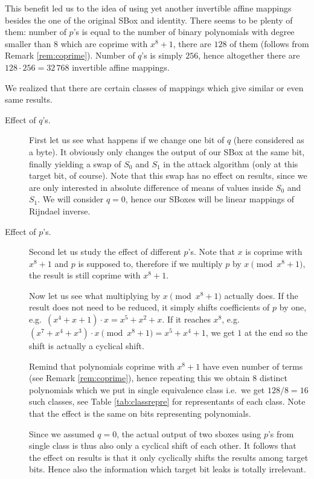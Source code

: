This benefit led us to the idea of using yet another invertible affine mappings besides the one of the original SBox and identity. There seems to be plenty of them: number of $p$'s is equal to the number of binary polynomials with degree smaller than $8$ which are coprime with $x^8+1$, there are $128$ of them (follows from Remark \ref{rem:coprime}). Number of $q$'s is simply $256$, hence altogether there are $128\cdot 256 = 32\,768$ invertible affine mappings.

\begin{remark}
\label{rem:pqeffect}
	We realized that there are certain classes of mappings which give similar or even same results.
	\begin{description}
		\item[Effect of $q$'s.]
			First let us see what happens if we change one bit of $q$ (here considered as a byte). It obviously only changes the output of our SBox at the same bit, finally yielding a swap of $S_0$ and $S_1$ in the attack algorithm (only at this target bit, of course). Note that this swap has no effect on results, since we are only interested in absolute difference of means of values inside $S_0$ and $S_1$. We will consider $q = 0$, hence our SBoxes will be linear mappings of Rijndael inverse.
		
		\item[Effect of $p$'s.]
			Second let us study the effect of different $p$'s. Note that $x$ is coprime with $x^8+1$ and $p$ is supposed to, therefore if we multiply $p$ by $x\pmod{x^8+1}$, the result is still coprime with $x^8+1$.
			
			Now let us see what multiplying by $x\pmod{x^8+1}$ actually does. If the result does not need to be reduced, it simply shifts coefficients of $p$ by one, e.g.\ $(x^4 + x + 1) \cdot x = x^5 + x^2 + x$. If it reaches $x^8$, e.g.\ $(x^7 + x^4 + x^3) \cdot x \pmod{x^8+1} = x^5 + x^4 + 1$, we get $1$ at the end so the shift is actually a cyclical shift.
			
			Remind that polynomials coprime with $x^8+1$ have even number of terms (see Remark \ref{rem:coprime}), hence repeating this we obtain $8$ distinct polynomials which we put in single equivalence class i.e.\ we get $128/8=16$ such classes, see Table \ref{tab:classrepre} for representants of each class. Note that the effect is the same on bits representing polynomials.
			
			Since we assumed $q = 0$, the actual output of two sboxes using $p$'s from single class is thus also only a cyclical shift of each other. It follows that the effect on results is that it only cyclically shifts the results among target bits. Hence also the information which target bit leaks is totally irrelevant.
	\end{description}
\end{remark}

